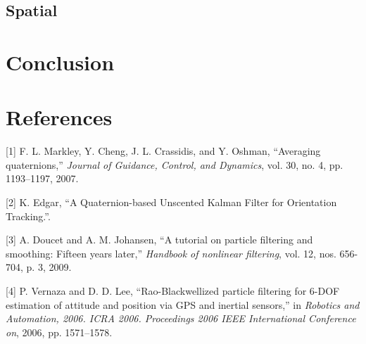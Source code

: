 \documentclass[12pt,]{article}
\begin{document}
\subsection{Spatial}\label{spatial-2}

\section*{Conclusion}\label{conclusion-2}

\section*{References}\label{references-1}

\hypertarget{refs}{}
\hypertarget{ref-markley_averaging_2007}{}
{[}1{]} F. L. Markley, Y. Cheng, J. L. Crassidis, and Y. Oshman,
``Averaging quaternions,'' \emph{Journal of Guidance, Control, and
Dynamics}, vol. 30, no. 4, pp. 1193--1197, 2007.

\hypertarget{ref-edgar_quaternion-based_nodate}{}
{[}2{]} K. Edgar, ``A Quaternion-based Unscented Kalman Filter for
Orientation Tracking.''.

\hypertarget{ref-doucet_tutorial_2009}{}
{[}3{]} A. Doucet and A. M. Johansen, ``A tutorial on particle filtering
and smoothing: Fifteen years later,'' \emph{Handbook of nonlinear
filtering}, vol. 12, nos. 656-704, p. 3, 2009.

\hypertarget{ref-vernaza_rao-blackwellized_2006}{}
{[}4{]} P. Vernaza and D. D. Lee, ``Rao-Blackwellized particle filtering
for 6-DOF estimation of attitude and position via GPS and inertial
sensors,'' in \emph{Robotics and Automation, 2006. ICRA 2006.
Proceedings 2006 IEEE International Conference on}, 2006, pp.
1571--1578.
\end{document}
